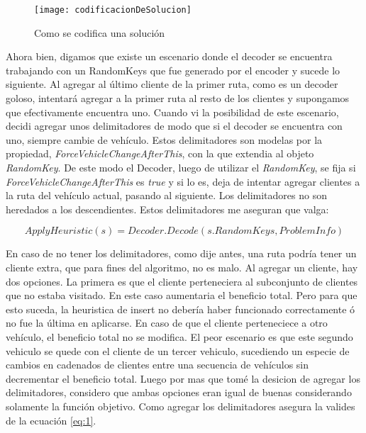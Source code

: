 \bigskip

\begin{figure}[h]
	\caption{Como se codifica una solución}
	\centering
	\texttt{[image: codificacionDeSolucion]}
	\label{fig:codificacionDeSolucion}
\end{figure}

\bigskip

Ahora bien, digamos que existe un escenario donde el decoder se encuentra trabajando con un RandomKeys que fue generado por el encoder y sucede lo siguiente. Al agregar al último cliente de la primer ruta, como es un decoder goloso, intentará agregar a la primer ruta al resto de los clientes y supongamos que efectivamente encuentra uno. Cuando vi la posibilidad de este escenario, decidi agregar unos delimitadores de modo que si el decoder se encuentra con uno, siempre cambie de vehículo. Estos delimitadores son modelas por la propiedad, \textit{ForceVehicleChangeAfterThis}, con la que extendia al objeto \textit{RandomKey}. De este modo el Decoder, luego de utilizar el \textit{RandomKey}, se fija si \textit{ForceVehicleChangeAfterThis} es \textit{true} y si lo es, deja de intentar agregar clientes a la ruta del vehículo actual, pasando al siguiente. Los delimitadores no son heredados a los descendientes. Estos delimitadores me aseguran que valga: 

\begin{equation} \label{eq:1}
ApplyHeuristic(s) = Decoder.Decode(s.RandomKeys, ProblemInfo)
\end{equation}

\bigskip

En caso de no tener los delimitadores, como dije antes, una ruta podría tener un cliente extra, que para fines del algoritmo, no es malo. Al agregar un cliente, hay dos opciones. La primera es que el cliente perteneciera al subconjunto de clientes que no estaba visitado. En este caso aumentaria el beneficio total. Pero para que esto suceda, la heuristica de insert no debería haber funcionado correctamente ó no fue la última en aplicarse. En caso de que el cliente perteneciece a otro vehículo, el beneficio total no se modifica. El peor escenario es que este segundo vehiculo se quede con el cliente de un tercer vehiculo, sucediendo un especie de cambios en cadenados de clientes entre una secuencia de vehículos sin decrementar el beneficio total. Luego por mas que tomé la desicion de agregar los delimitadores, considero que ambas opciones eran igual de buenas considerando solamente la función objetivo. Como agregar los delimitadores asegura la valides de la ecuación \ref{eq:1}.


